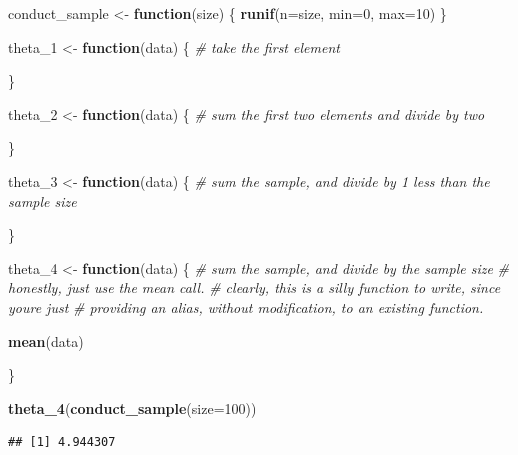 \documentclass[
]{article}
\newenvironment{Shaded}{\begin{snugshade}}{\end{snugshade}}
\newcommand{\AttributeTok}[1]{\textcolor[rgb]{0.13,0.29,0.53}{#1}}
\newcommand{\CommentTok}[1]{\textcolor[rgb]{0.56,0.35,0.01}{\textit{#1}}}
\newcommand{\ControlFlowTok}[1]{\textcolor[rgb]{0.13,0.29,0.53}{\textbf{#1}}}
\newcommand{\DecValTok}[1]{\textcolor[rgb]{0.00,0.00,0.81}{#1}}
\newcommand{\FunctionTok}[1]{\textcolor[rgb]{0.13,0.29,0.53}{\textbf{#1}}}
\newcommand{\NormalTok}[1]{#1}
\newcommand{\OtherTok}[1]{\textcolor[rgb]{0.56,0.35,0.01}{#1}}
\theoremstyle{definition}
\theoremstyle{definition}
\theoremstyle{definition}
\theoremstyle{definition}
\theoremstyle{remark}
\begin{document}
\begin{Shaded}
\begin{Highlighting}[]
\NormalTok{conduct\_sample }\OtherTok{\textless{}{-}} \ControlFlowTok{function}\NormalTok{(size) \{ }
  \FunctionTok{runif}\NormalTok{(}\AttributeTok{n=}\NormalTok{size, }\AttributeTok{min=}\DecValTok{0}\NormalTok{, }\AttributeTok{max=}\DecValTok{10}\NormalTok{)}
\NormalTok{\}}
\end{Highlighting}
\end{Shaded}

\begin{Shaded}
\begin{Highlighting}[]
\NormalTok{theta\_1 }\OtherTok{\textless{}{-}} \ControlFlowTok{function}\NormalTok{(data) \{ }
  \CommentTok{\# take the first element}
  
\NormalTok{\}}

\NormalTok{theta\_2 }\OtherTok{\textless{}{-}} \ControlFlowTok{function}\NormalTok{(data) \{ }
  \CommentTok{\# sum the first two elements and divide by two}
  
\NormalTok{\}}

\NormalTok{theta\_3 }\OtherTok{\textless{}{-}} \ControlFlowTok{function}\NormalTok{(data) \{ }
  \CommentTok{\# sum the sample, and divide by 1 less than the sample size}
  
\NormalTok{\}}

\NormalTok{theta\_4 }\OtherTok{\textless{}{-}} \ControlFlowTok{function}\NormalTok{(data) \{ }
  \CommentTok{\# sum the sample, and divide by the sample size }
  \CommentTok{\# honestly, just use the mean call. }
  \CommentTok{\# clearly, this is a silly function to write, since you\textquotesingle{}re just }
  \CommentTok{\# providing an alias, without modification, to an existing function. }
  
  \FunctionTok{mean}\NormalTok{(data)}
  
\NormalTok{\}}
\end{Highlighting}
\end{Shaded}

\begin{Shaded}
\begin{Highlighting}[]
\FunctionTok{theta\_4}\NormalTok{(}\FunctionTok{conduct\_sample}\NormalTok{(}\AttributeTok{size=}\DecValTok{100}\NormalTok{))}
\end{Highlighting}
\end{Shaded}

\begin{verbatim}
## [1] 4.944307
\end{verbatim}
\end{document}
